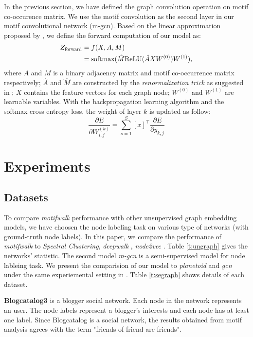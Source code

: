 \documentclass{article}
\theoremstyle{definition}
\begin{document}
In the previous section, we have defined the graph convolution
operation on motif co-occurence matrix. We use the motif convolution
as the second layer in our motif convolutional network (m-gcn). Based on the 
linear approximation proposed by \citeauthor{gcn}, we define the forward
computation of our model as:
\begin{equation} \label{eq:2}
    \begin{aligned}
    Z_{\scalebox{0.75}{forward}} &= f(X,A,M) \\
    &= \mbox{softmax}(\hat{M} \mbox{ReLU}(\hat{A}XW^{(0)})W^{(1)}),
    \end{aligned}
\end{equation}
where $A$ and $M$ is a binary adjacency matrix and motif co-occurrence
matrix respectively; $\hat{A}$ and $\hat{M}$ are constructed by the
\emph{renormalization trick} as suggested in \cite{gcn}; $X$ contains
the feature vectors for each graph node; $W^{(0)}$ and $W^{(1)}$ are
learnable variables. With the backpropagation learning algorithm and the
softmax cross entropy loss, the weight of layer $k$ is updated as follow: 
\begin{equation}
\label{eq:3}
\frac{\partial E}{\partial W^{(k)}_{i,j}} = \sum^S_{s=1} [x]^\top \frac{\partial E}{\partial y_{k,j}}
\end{equation}

\section{Experiments}

\subsection{Datasets}

To compare \emph{motifwalk} performance with other unsupervised graph
embedding models, we have choosen the node labeling task on various
type of networks (with ground-truth node labels). In this paper, we
compare the performance of \emph{motifwalk} to 
\emph{Spectral Clustering}, 
\emph{deepwalk} \cite{deepwalk}, \emph{node2vec} \cite{node2vec}. Table \ref{t:ungraph}
gives the networks' statistic. The second model \emph{m-gcn} is a semi-supervised model for node
lableing task. We present the comparision of our model to \emph{planetoid} and
\emph{gcn} under the same experiemental setting in \cite{gcn}. Table \ref{t:segraph}
shows details of each dataset.

\textbf{Blogcatalog3} \cite{blogcatalog} is a blogger social network. Each node
in the network represents an user. The node labels represent a blogger's interests and
each node has at least one label. Since Blogcatalog is a social network, the results
obtained from motif analysis agrees with the term "friends of friend are friends".
\end{document}
